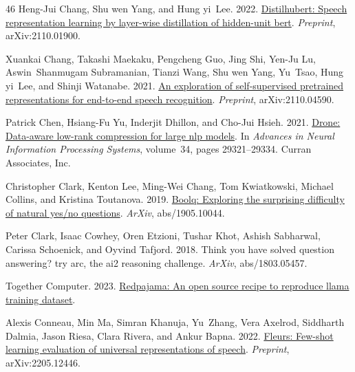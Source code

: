 \documentclass[11pt]{article}
\begin{document}
\begin{thebibliography}{46}
Heng-Jui Chang, Shu wen Yang, and Hung yi~Lee. 2022.
\newblock \href {https://arxiv.org/abs/2110.01900} {Distilhubert: Speech representation learning by layer-wise distillation of hidden-unit bert}.
\newblock \emph{Preprint}, arXiv:2110.01900.

Xuankai Chang, Takashi Maekaku, Pengcheng Guo, Jing Shi, Yen-Ju Lu, Aswin~Shanmugam Subramanian, Tianzi Wang, Shu wen Yang, Yu~Tsao, Hung yi~Lee, and Shinji Watanabe. 2021.
\newblock \href {https://arxiv.org/abs/2110.04590} {An exploration of self-supervised pretrained representations for end-to-end speech recognition}.
\newblock \emph{Preprint}, arXiv:2110.04590.

Patrick Chen, Hsiang-Fu Yu, Inderjit Dhillon, and Cho-Jui Hsieh. 2021.
\newblock \href {https://proceedings.neurips.cc/paper_files/paper/2021/file/f56de5ef149cf0aedcc8f4797031e229-Paper.pdf} {Drone: Data-aware low-rank compression for large nlp models}.
\newblock In \emph{Advances in Neural Information Processing Systems}, volume~34, pages 29321--29334. Curran Associates, Inc.

Christopher Clark, Kenton Lee, Ming-Wei Chang, Tom Kwiatkowski, Michael Collins, and Kristina Toutanova. 2019.
\newblock \href {https://api.semanticscholar.org/CorpusID:165163607} {Boolq: Exploring the surprising difficulty of natural yes/no questions}.
\newblock \emph{ArXiv}, abs/1905.10044.

Peter Clark, Isaac Cowhey, Oren Etzioni, Tushar Khot, Ashish Sabharwal, Carissa Schoenick, and Oyvind Tafjord. 2018.
\newblock Think you have solved question answering? try arc, the ai2 reasoning challenge.
\newblock \emph{ArXiv}, abs/1803.05457.

Together Computer. 2023.
\newblock \href {https://github.com/togethercomputer/RedPajama-Data} {Redpajama: An open source recipe to reproduce llama training dataset}.

Alexis Conneau, Min Ma, Simran Khanuja, Yu~Zhang, Vera Axelrod, Siddharth Dalmia, Jason Riesa, Clara Rivera, and Ankur Bapna. 2022.
\newblock \href {https://arxiv.org/abs/2205.12446} {Fleurs: Few-shot learning evaluation of universal representations of speech}.
\newblock \emph{Preprint}, arXiv:2205.12446.


\end{thebibliography}
\end{document}
